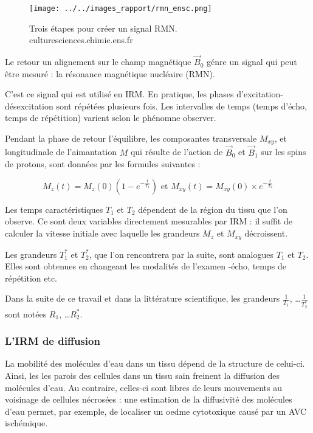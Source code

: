 \begin{figure}[!b]
\texttt{[image: ../../images\_rapport/rmn\_ensc.png]}
\caption{Trois \'etapes pour cr\'eer un signal RMN.
\\
culturesciences.chimie.ens.fr}
\label{irm_b01}
\end{figure}

\par
Le retour  un alignement sur le champ magn\'etique $\vec{B}_0$ g\'enre un signal qui peut \^etre mesur\'e : %
la r\'esonance magn\'etique nucl\'eaire (RMN).

\par
C'est ce signal qui est utilis\'e en IRM. En pratique, les phases d'excitation-d\'esexcitation sont r\'ep\'et\'ees plusieurs fois. %
Les intervalles de temps (temps d'\'echo, temps de r\'ep\'etition) varient selon le ph\'enomne  observer.

\etoile

\newpage
Pendant la phase de retour  l'\'equilibre, les composantes transversale $M_{xy}$, %
et longitudinale de l'aimantation $M$ qui r\'esulte de l'action de $\vec{B}_0$ et $\vec{B}_1$ sur les spins de protons, %
sont donn\'ees par les formules suivantes :

\[M_z(t)=M_z(0)\left(1-e^{-\frac{t}{T_1}}\right)\text{ et }M_{xy}(t)=M_{xy}(0)\times e^{-\frac{t}{T_2}}\]

Les temps caract\'eristiques $T_1$ et $T_2$ d\'ependent de la r\'egion du tissu que l'on observe. %
Ce sont deux variables directement mesurables par IRM : %
il suffit de calculer la vitesse initiale avec laquelle les grandeurs $M_z$ et $M_{xy}$ d\'ecroissent.

\par
Les grandeurs $T_1^{\ast}$ et $T_2^{\ast}$, que l'on rencontrera par la suite, sont analogues  $T_1$ et $T_2$. %
Elles sont obtenues en changeant les modalit\'es de l'examen -\'echo, temps de r\'ep\'etition etc.

\etoile
Dans la suite de ce travail et dans la litt\'erature scientifique, %
les grandeurs $\frac{1}{T_1}$, \dots $\frac{1}{T_2^{\ast}}$ sont not\'ees $R_1$, \dots $R_2^{\ast}$.

\FloatBarrier
\subsubsection{L'IRM de diffusion}

La mobilit\'e des mol\'ecules d'eau dans un tissu d\'epend de la structure de celui-ci. %
Ainsi, les les parois des cellules dans un tissu sain freinent la diffusion des mol\'ecules d'eau. %
Au contraire, celles-ci sont libres de leurs mouvements au voisinage de cellules n\'ecros\'ees : %
une estimation de la diffusivit\'e des mol\'ecules d'eau permet, par exemple, de localiser un oedme cytotoxique caus\'e par un AVC isch\'emique.

